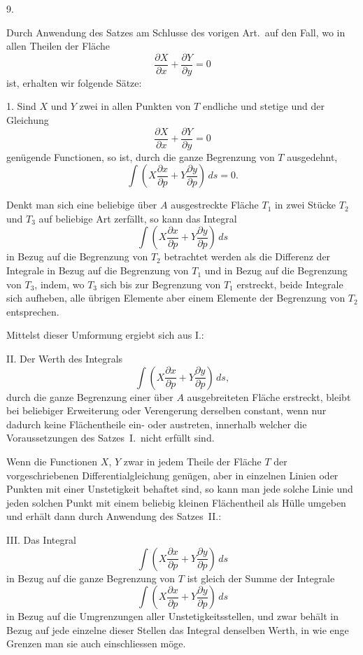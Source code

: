 \documentclass[a4paper,12pt]{article}
\begin{document}
\medbreak

\centerline{9.}

\nobreak\medskip

Durch Anwendung des Satzes am Schlusse des vorigen Art.\ auf den
Fall, wo in allen Theilen der Fl\"{a}che
\[ \frac{\partial X}{\partial x} + \frac{\partial Y}{\partial y}
   = 0 \]
ist, erhalten wir folgende S\"{a}tze:

1.  Sind $X$ und $Y$ zwei in allen Punkten von $T$ endliche und
stetige und der Gleichung
\[ \frac{\partial X}{\partial x} + \frac{\partial Y}{\partial y}
   = 0 \]
gen\"{u}gende Functionen, so ist, durch die ganze Begrenzung von
$T$ ausgedehnt,
\[ \int  \left(
            X \frac{\partial x}{\partial p}
          + Y \frac{\partial y}{\partial p}
         \right) \, ds
    = 0.\]

Denkt man sich eine beliebige \"{u}ber $A$ ausgestreckte
Fl\"{a}che $T_1$ in zwei St\"{u}cke $T_2$ und $T_3$ auf
beliebige Art zerf\"{a}llt, so kann das Integral
\[ \int  \left(
            X \frac{\partial x}{\partial p}
          + Y \frac{\partial y}{\partial p}
         \right) \, ds \]
in Bezug auf die Begrenzung von $T_2$ betrachtet werden als die
Differenz der Integrale in Bezug auf die Begrenzung von $T_1$ und
in Bezug auf die Begrenzung von $T_3$, indem, wo $T_3$ sich bis
zur Begrenzung von $T_1$ erstreckt, beide Integrale sich
aufheben, alle \"{u}brigen Elemente aber einem Elemente der
Begrenzung von $T_2$ entsprechen.

Mittelst dieser Umformung ergiebt sich aus I.:

II.  Der Werth des Integrals
\[ \int  \left(
            X \frac{\partial x}{\partial p}
          + Y \frac{\partial y}{\partial p}
         \right) \, ds,\]
durch die ganze Begrenzung einer \"{u}ber $A$ ausgebreiteten
Fl\"{a}che erstreckt, bleibt bei beliebiger Erweiterung oder
Verengerung derselben constant, wenn nur dadurch keine
Fl\"{a}chentheile ein- oder austreten, innerhalb welcher die
Voraussetzungen des Satzes~I.\ nicht erf\"{u}llt sind.

Wenn die Functionen $X$, $Y$ zwar in jedem Theile der Fl\"{a}che
$T$ der vorgeschriebenen Differentialgleichung gen\"{u}gen, aber
in einzelnen Linien oder Punkten mit einer Unstetigkeit behaftet
sind, so kann man jede solche Linie und jeden solchen Punkt mit
einem beliebig kleinen Fl\"{a}chentheil als H\"{u}lle umgeben und
erh\"{a}lt dann durch Anwendung des Satzes~II.:

III.  Das Integral
\[ \int  \left(
            X \frac{\partial x}{\partial p}
          + Y \frac{\partial y}{\partial p}
         \right) \, ds \]
in Bezug auf die ganze Begrenzung von $T$ ist gleich der Summe der
Integrale
\[ \int  \left(
            X \frac{\partial x}{\partial p}
          + Y \frac{\partial y}{\partial p}
         \right) \, ds \]
in Bezug auf die Umgrenzungen aller Unstetigkeitsstellen, und zwar
beh\"{a}lt in Bezug auf jede einzelne dieser Stellen das Integral
denselben Werth, in wie enge Grenzen man sie auch einschliessen
m\"{o}ge.
\end{document}
